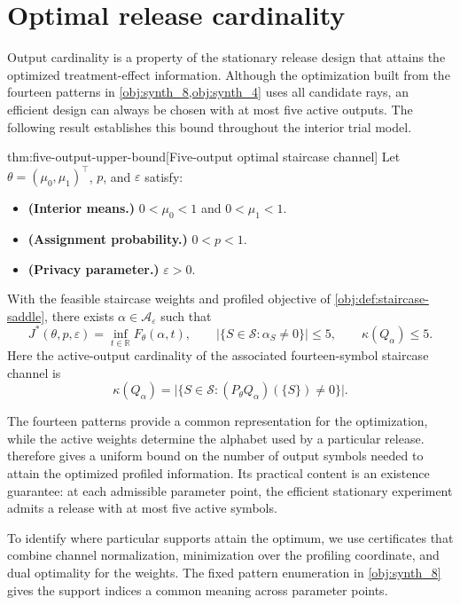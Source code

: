 \section{Optimal release cardinality}

Output cardinality is a property of the stationary release design that attains the optimized treatment-effect information. Although the optimization built from the fourteen patterns in \cref{obj:synth_8,obj:synth_4} uses all candidate rays, an efficient design can always be chosen with at most five active outputs. The following result establishes this bound throughout the interior trial model.

\begin{theoremv}{thm:five-output-upper-bound}[Five-output optimal staircase channel]
Let \(\theta=(\mu_0,\mu_1)^\top\), \(p\), and \(\varepsilon\) satisfy:
\begin{itemize}
\item \textbf{(Interior means.)} \(0<\mu_0<1\) and \(0<\mu_1<1\).
\item \textbf{(Assignment probability.)} \(0<p<1\).
\item \textbf{(Privacy parameter.)} \(\varepsilon>0\).
\end{itemize}
With the feasible staircase weights and profiled objective of \cref{obj:def:staircase-saddle}, there exists \(\alpha\in\mathcal A_\varepsilon\) such that
\[
J^*(\theta,p,\varepsilon)
=
\inf_{t\in\mathbb R}F_\theta(\alpha,t),
\qquad
\bigl|\{S\in\mathcal S:\alpha_S\ne0\}\bigr|\le5,
\qquad
\kappa(Q_\alpha)\le5.
\]
Here the active-output cardinality of the associated fourteen-symbol staircase channel is
\[
\kappa(Q_\alpha)
=
\bigl|\{S\in\mathcal S:(P_\theta Q_\alpha)(\{S\})\ne0\}\bigr|.
\]
\end{theoremv}

The fourteen patterns provide a common representation for the optimization, while the active weights determine the alphabet used by a particular release.  therefore gives a uniform bound on the number of output symbols needed to attain the optimized profiled information. Its practical content is an existence guarantee: at each admissible parameter point, the efficient stationary experiment admits a release with at most five active symbols.

To identify where particular supports attain the optimum, we use certificates that combine channel normalization, minimization over the profiling coordinate, and dual optimality for the weights. The fixed pattern enumeration in \cref{obj:synth_8} gives the support indices a common meaning across parameter points.

